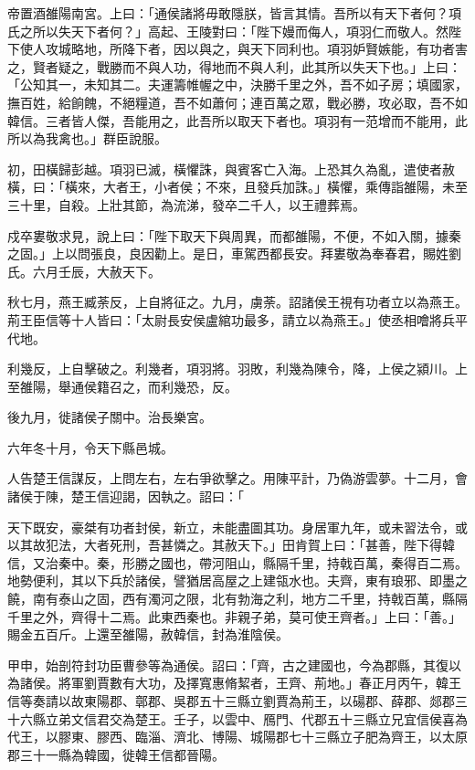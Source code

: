 \begin{pinyinscope}
帝置酒雒陽南宮。上曰：「通侯諸將毋敢隱朕，皆言其情。吾所以有天下者何？項氏之所以失天下者何？」高起、王陵對曰：「陛下嫚而侮人，項羽仁而敬人。然陛下使人攻城略地，所降下者，因以與之，與天下同利也。項羽妒賢嫉能，有功者害之，賢者疑之，戰勝而不與人功，得地而不與人利，此其所以失天下也。」上曰：「公知其一，未知其二。夫運籌帷幄之中，決勝千里之外，吾不如子房；填國家，撫百姓，給餉餽，不絕糧道，吾不如蕭何；連百萬之眾，戰必勝，攻必取，吾不如韓信。三者皆人傑，吾能用之，此吾所以取天下者也。項羽有一范增而不能用，此所以為我禽也。」群臣說服。

初，田橫歸彭越。項羽已滅，橫懼誅，與賓客亡入海。上恐其久為亂，遣使者赦橫，曰：「橫來，大者王，小者侯；不來，且發兵加誅。」橫懼，乘傳詣雒陽，未至三十里，自殺。上壯其節，為流涕，發卒二千人，以王禮葬焉。

戍卒婁敬求見，說上曰：「陛下取天下與周異，而都雒陽，不便，不如入關，據秦之固。」上以問張良，良因勸上。是日，車駕西都長安。拜婁敬為奉春君，賜姓劉氏。六月壬辰，大赦天下。

秋七月，燕王臧荼反，上自將征之。九月，虜荼。詔諸侯王視有功者立以為燕王。荊王臣信等十人皆曰：「太尉長安侯盧綰功最多，請立以為燕王。」使丞相噲將兵平代地。

利幾反，上自擊破之。利幾者，項羽將。羽敗，利幾為陳令，降，上侯之潁川。上至雒陽，舉通侯籍召之，而利幾恐，反。

後九月，徙諸侯子關中。治長樂宮。

六年冬十月，令天下縣邑城。

人告楚王信謀反，上問左右，左右爭欲擊之。用陳平計，乃偽游雲夢。十二月，會諸侯于陳，楚王信迎謁，因執之。詔曰：「

天下既安，豪桀有功者封侯，新立，未能盡圖其功。身居軍九年，或未習法令，或以其故犯法，大者死刑，吾甚憐之。其赦天下。」田肯賀上曰：「甚善，陛下得韓信，又治秦中。秦，形勝之國也，帶河阻山，縣隔千里，持戟百萬，秦得百二焉。地勢便利，其以下兵於諸侯，譬猶居高屋之上建瓴水也。夫齊，東有琅邪、即墨之饒，南有泰山之固，西有濁河之限，北有勃海之利，地方二千里，持戟百萬，縣隔千里之外，齊得十二焉。此東西秦也。非親子弟，莫可使王齊者。」上曰：「善。」賜金五百斤。上還至雒陽，赦韓信，封為淮陰侯。

甲申，始剖符封功臣曹參等為通侯。詔曰：「齊，古之建國也，今為郡縣，其復以為諸侯。將軍劉賈數有大功，及擇寬惠脩絜者，王齊、荊地。」春正月丙午，韓王信等奏請以故東陽郡、鄣郡、吳郡五十三縣立劉賈為荊王，以碭郡、薛郡、郯郡三十六縣立弟文信君交為楚王。壬子，以雲中、鴈門、代郡五十三縣立兄宜信侯喜為代王，以膠東、膠西、臨淄、濟北、博陽、城陽郡七十三縣立子肥為齊王，以太原郡三十一縣為韓國，徙韓王信都晉陽。


\end{pinyinscope}
